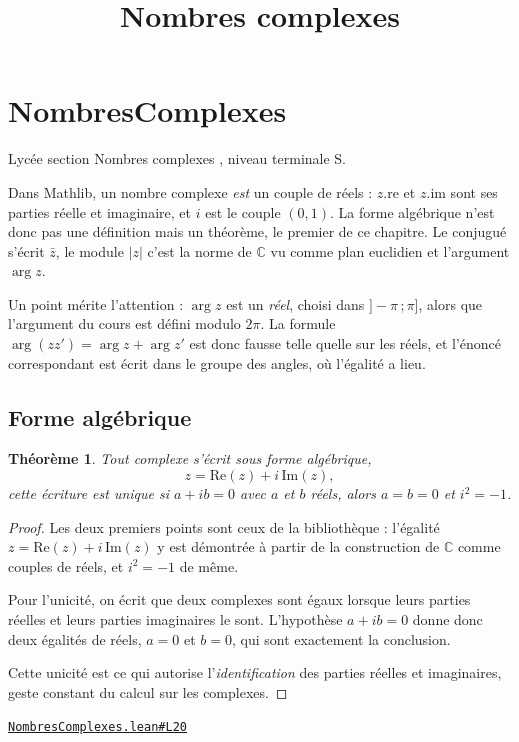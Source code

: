 \documentclass[11pt,a4paper]{article}
\title{Nombres complexes}
\date{}
\theoremstyle{definition}
\theoremstyle{plain}
\newtheorem{theoreme}{Théorème}
\newcommand{\source}[2]{\par\smallskip\noindent\hfill{\footnotesize\href{#1}{\texttt{#2}}}\par\smallskip}
\begin{document}
\maketitle
\sloppy

\section{NombresComplexes}

\noindent
Lycée \textemdash{} section \og{} Nombres complexes \fg{}, niveau terminale S.

\medskip\noindent
Dans Mathlib, un nombre complexe \emph{est} un couple de réels : $z.\mathrm{re}$ et
$z.\mathrm{im}$ sont ses parties réelle et imaginaire, et $i$ est le couple $(0, 1)$. La
forme algébrique n'est donc pas une définition mais un théorème, le premier de ce
chapitre. Le conjugué s'écrit $\bar z$, le module $|z|$ \textemdash{} c'est la norme de
$\mathbb{C}$ vu comme plan euclidien \textemdash{} et l'argument $\arg z$.

\medskip\noindent
Un point mérite l'attention : $\arg z$ est un \emph{réel}, choisi dans
$]-\pi\,;\pi]$, alors que l'argument du cours est défini modulo $2\pi$. La formule
$\arg(zz') = \arg z + \arg z'$ est donc fausse telle quelle sur les réels, et l'énoncé
correspondant est écrit dans le groupe des angles, où l'égalité a lieu.

\subsection{Forme algébrique}

\begin{theoreme}
Tout complexe s'écrit sous forme algébrique,
\[ z = \mathrm{Re}(z) + i\,\mathrm{Im}(z) , \]
cette écriture est unique \textemdash{} si $a + ib = 0$ avec $a$ et $b$ réels, alors
$a = b = 0$ \textemdash{} et $i^{2} = -1$.
\end{theoreme}

\begin{proof}
Les deux premiers points sont ceux de la bibliothèque : l'égalité
$z = \mathrm{Re}(z) + i\,\mathrm{Im}(z)$ y est démontrée à partir de la construction de
$\mathbb{C}$ comme couples de réels, et $i^{2} = -1$ de même.

Pour l'unicité, on écrit que deux complexes sont égaux lorsque leurs parties réelles et
leurs parties imaginaires le sont. L'hypothèse $a + ib = 0$ donne donc deux égalités de
réels, $a = 0$ et $b = 0$, qui sont exactement la conclusion.

\medskip\noindent
Cette unicité est ce qui autorise l'\emph{identification} des parties réelles et
imaginaires, geste constant du calcul sur les complexes.
\end{proof}
\source{https://github.com/Commutator-IO/learn-lean/blob/main/cours/02-lycee/07-nombres-complexes/NombresComplexes.lean\#L20}{NombresComplexes.lean\#L20}
\end{document}

